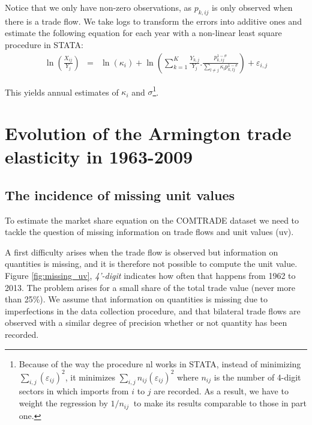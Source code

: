 \documentclass[12pt,twoside,a4paper,notitlepage]{article}
\begin{document}
Notice that we only have non-zero observations, as ${{p}_{k,ij}}$ is only observed when there is a trade flow. We take logs to transform the errors into additive ones and estimate the following equation for each year with a non-linear least square procedure in STATA:
\begin{eqnarray}
   \ln \left( \frac{{{X}_{ij}}}{{{Y}_{j}}} \right) & = & \ln \left( {{\kappa }_{i}} \right)+\ln \left( \sum\limits_{k=1}^{K}{\frac{{{Y}_{k,j}}}{{{Y}_{j}}}.}\frac{p_{k,ij}^{1-\sigma }}{\sum\limits_{l\ne j}{{{\kappa }_{l}}}p_{k,lj}^{1-\sigma }} \right) +{{\varepsilon }_{i,j}}
   \label{eqn:nlestimation}
   \end{eqnarray}
   
   	
This yields annual estimates of ${{\kappa }_{i}}$ and $\sigma $\footnote{Because of the way the procedure nl works in STATA, instead of minimizing $\sum\limits_{i,j}{{{\left( {{\varepsilon }_{ij}} \right)}^{2}}}$, it minimizes $\sum\limits_{i,j}{{{n}_{ij}}{{\left( {{\varepsilon }_{ij}} \right)}^{2}}}$ where ${{n}_{ij}}$ is the number of 4-digit sectors in which imports from $i$ to $j$ are recorded. As a result, we have to weight the regression by $1/{{n}_{ij}}\ $ to make its results comparable to those in part one.
}. 

\section{ \label{ref-003}Evolution of the Armington trade elasticity in 1963-2009\label{mark-2.}}



\subsection{ \label{ref-004}The incidence of missing unit values\label{mark-2.1.}}



To estimate the market share equation on the COMTRADE dataset we need to tackle the question of missing information on trade flows and unit values (uv).

A first difficulty arises when the trade flow is observed but information on quantities is missing, and it is therefore not possible to compute the unit value. Figure \ref{fig:missing_uv}, \textit{4'-digit} indicates how often that happens from 1962 to 2013. The problem arises for a small share of the total trade value (never more than 25\%).
We assume that information on quantities is missing due to imperfections in the data collection procedure, and that bilateral trade flows are observed with a similar degree of precision whether or not quantity has been recorded.
\end{document}
